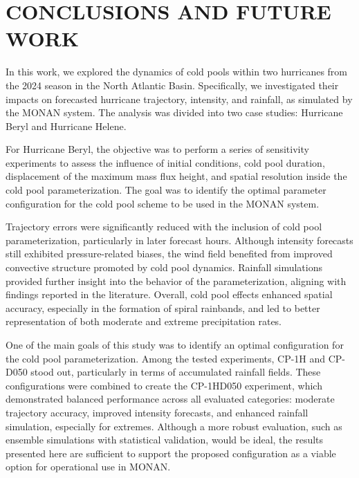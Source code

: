 \chapter{CONCLUSIONS AND FUTURE WORK}
\label{ch:conclusion}

In this work, we explored the dynamics of cold pools within two hurricanes from the 2024 season in the North Atlantic Basin. Specifically, we investigated their impacts on forecasted hurricane trajectory, intensity, and rainfall, as simulated by the MONAN system. The analysis was divided into two case studies: Hurricane Beryl and Hurricane Helene.

For Hurricane Beryl, the objective was to perform a series of sensitivity experiments to assess the influence of initial conditions, cold pool duration, displacement of the maximum mass flux height, and spatial resolution inside the cold pool parameterization. The goal was to identify the optimal parameter configuration for the cold pool scheme to be used in the MONAN system.

Trajectory errors were significantly reduced with the inclusion of cold pool parameterization, particularly in later forecast hours. Although intensity forecasts still exhibited pressure-related biases, the wind field benefited from improved convective structure promoted by cold pool dynamics. Rainfall simulations provided further insight into the behavior of the parameterization, aligning with findings reported in the literature. Overall, cold pool effects enhanced spatial accuracy, especially in the formation of spiral rainbands, and led to better representation of both moderate and extreme precipitation rates.

One of the main goals of this study was to identify an optimal configuration for the cold pool parameterization. Among the tested experiments, CP-1H and CP-D050 stood out, particularly in terms of accumulated rainfall fields. These configurations were combined to create the CP-1HD050 experiment, which demonstrated balanced performance across all evaluated categories: moderate trajectory accuracy, improved intensity forecasts, and enhanced rainfall simulation, especially for extremes. Although a more robust evaluation, such as ensemble simulations with statistical validation, would be ideal, the results presented here are sufficient to support the proposed configuration as a viable option for operational use in MONAN.


